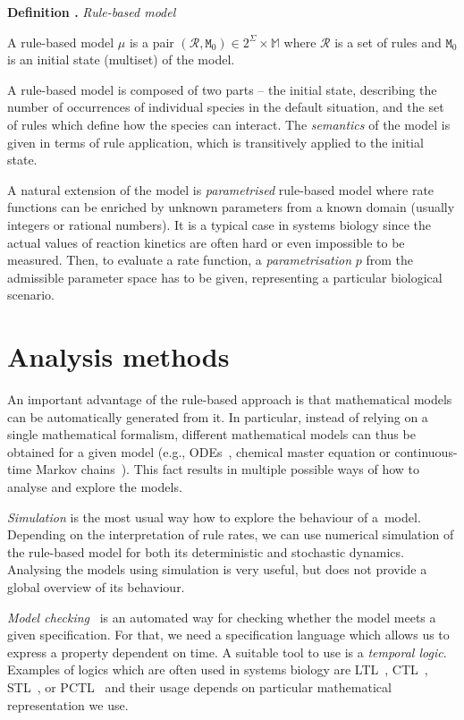 \documentclass[11pt,a4paper]{report}
\newcounter{counter}[section]
\renewcommand{\thecounter}{\thechapter.\arabic{counter}}
\newenvironment{definition}[1]{\bigskip\refstepcounter{counter}\noindent\textbf{Definition \thecounter } \emph{#1} \par\nopagebreak\noindent \begin{itshape}}{\end{itshape}\bigskip}
\begin{document}
\begin{definition}{Rule-based model}
A rule-based model $\mu$ is a pair $(\mathcal{R}, \mathtt{M}_0) \in 2^\Sigma \times \mathbb{M}$ where $\mathcal{R}$ is a set of rules and $\mathtt{M}_0$ is an initial state (multiset) of the model.
\end{definition}

A rule-based model is composed of two parts -- the initial state, describing the number of occurrences of individual species in the default situation, and the set of rules which define how the species can interact. The \emph{semantics} of the model is given in terms of rule application, which is transitively applied to the initial state.

A natural extension of the model is \emph{parametrised} rule-based model where rate functions can be enriched by unknown parameters from a known domain (usually integers or rational numbers). It is a typical case in systems biology since the actual values of reaction kinetics are often hard or even impossible to be measured. Then, to evaluate a rate function, a \emph{parametrisation} $p$ from the admissible parameter space has to be given, representing a particular biological scenario.

\section{Analysis methods}

An important advantage of the rule-based approach is that mathematical models can be automatically generated from it. In particular, instead of relying on a single mathematical formalism, different mathematical models can thus be obtained for a given model (e.g., ODEs~\cite{camporesi2017k}, chemical master equation or continuous-time Markov chains~\cite{pauleve2010generic,sneddon2011efficient}). This fact results in multiple possible ways of how to analyse and explore the models. 

\emph{Simulation} is the most usual way how to explore the behaviour of a~model. Depending on the interpretation of rule rates, we can use numerical simulation of the rule-based model for both its deterministic and stochastic dynamics. Analysing the models using simulation is very useful, but does not provide a global overview of its behaviour.

\emph{Model checking}~\cite{clarke2018model} is an automated way for checking whether the model meets a given specification. For that, we need a specification language which allows us to express a property dependent on time. A suitable tool to use is a \emph{temporal logic}. Examples of logics which are often used in systems biology are LTL~\cite{pnueli1977temporal}, CTL~\cite{clarke1986automatic}, STL~\cite{maler2004monitoring}, or PCTL~\cite{hasson1994logic} and their usage depends on particular mathematical representation we use.
\end{document}
